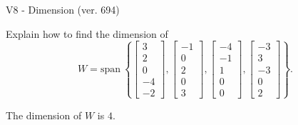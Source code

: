 \begin{exercise}
  \begin{exerciseTitle}V8 - Dimension (ver. 694)\end{exerciseTitle}
  \begin{exerciseStatement}
    Explain how to find the dimension of 
\[W=\mathrm{span}\ \left\{\left[\begin{array}{r}
3 \\
2 \\
0 \\
-4 \\
-2
\end{array}\right] , \left[\begin{array}{r}
-1 \\
0 \\
2 \\
0 \\
3
\end{array}\right] , \left[\begin{array}{r}
-4 \\
-1 \\
1 \\
0 \\
0
\end{array}\right] , \left[\begin{array}{r}
-3 \\
3 \\
-3 \\
0 \\
2
\end{array}\right]\right\}.\]



  \end{exerciseStatement}
  \begin{exerciseAnswer}
   The dimension of \(W\) is  \(4\).
  


  \end{exerciseAnswer}
\end{exercise}